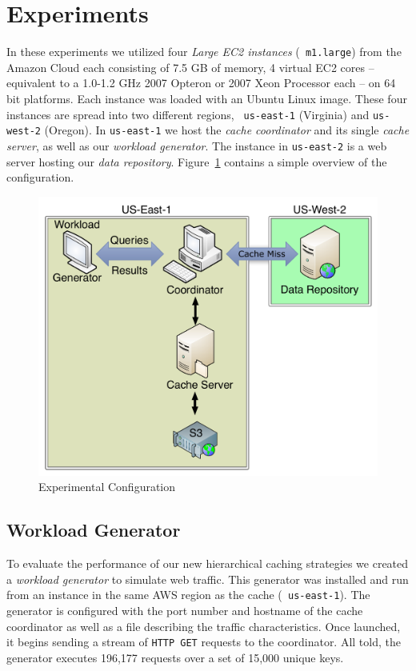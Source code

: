 \section{Experiments} %
\label{sec:experiments_storage}
In these experiments we utilized four \emph{Large EC2 instances} ({\tt
m1.large}) from the Amazon Cloud each consisting of 7.5 GB of memory, 4 virtual
EC2 cores -- equivalent to a 1.0-1.2 GHz 2007 Opteron or 2007 Xeon Processor
each -- on 64 bit platforms.  Each instance was loaded with an Ubuntu Linux
image. These four instances are spread into two different regions, {\tt
us-east-1} (Virginia) and {\tt us-west-2}
(Oregon)\cite{amazonEC2locations}. In {\tt us-east-1} we host the
\emph{cache coordinator} and its single \emph{cache server}, as well as our
\emph{workload generator}. The instance in {\tt us-east-2} is a web server
hosting our \emph{data repository}. Figure~\ref{fig:ca-experiment-config}
contains a simple overview of the configuration.

\begin{figure}
\begin{center}
\includegraphics[scale=0.5]{figures/hierarchy-experiment-config.pdf}
\end{center}
\caption{Experimental Configuration}
\label{fig:ca-experiment-config}
\end{figure}

\subsection{Workload Generator} %
\label{sub:work_generator}
To evaluate the performance of our new hierarchical caching strategies we
created a \emph{workload generator} to simulate web traffic. This generator was
installed and run from an instance in the same AWS region as the cache ({\tt
us-east-1}). The generator is configured with the port number and hostname of
the cache coordinator as well as a file describing the traffic characteristics.
Once launched, it begins sending a stream of {\tt HTTP GET} requests to the
coordinator. All told, the generator executes 196,177 requests over a set of
15,000 unique keys.


